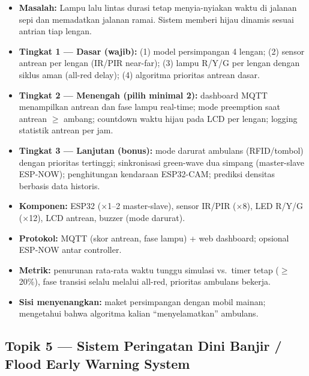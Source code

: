 \documentclass[11pt,a4paper]{article}
\begin{document}
\begin{itemize}
  \item \textbf{Masalah:} Lampu lalu lintas durasi tetap menyia-nyiakan waktu
        di jalanan sepi dan memadatkan jalanan ramai. Sistem memberi hijau
        dinamis sesuai antrian tiap lengan.
  \item \textbf{Tingkat 1 --- Dasar (wajib):} (1) model persimpangan 4
        lengan; (2) sensor antrean per lengan (IR/PIR near-far); (3) lampu
        R/Y/G per lengan dengan siklus aman (all-red delay); (4) algoritma
        prioritas antrean dasar.
  \item \textbf{Tingkat 2 --- Menengah (pilih minimal 2):} dashboard MQTT
        menampilkan antrean dan fase lampu real-time; mode preemption saat
        antrean $\geq$ ambang; countdown waktu hijau pada LCD per lengan;
        logging statistik antrean per jam.
  \item \textbf{Tingkat 3 --- Lanjutan (bonus):} mode darurat ambulans
        (RFID/tombol) dengan prioritas tertinggi; sinkronisasi green-wave dua
        simpang (master-slave ESP-NOW); penghitungan kendaraan ESP32-CAM;
        prediksi densitas berbasis data historis.
  \item \textbf{Komponen:} ESP32 ($\times$1--2 master-slave), sensor IR/PIR
        ($\times$8), LED R/Y/G ($\times$12), LCD antrean, buzzer (mode
        darurat).
  \item \textbf{Protokol:} MQTT (skor antrean, fase lampu) + web dashboard;
        opsional ESP-NOW antar controller.
  \item \textbf{Metrik:} penurunan rata-rata waktu tunggu simulasi vs.\ timer
        tetap ($\geq$ 20\%), fase transisi selalu melalui all-red, prioritas
        ambulans bekerja.
  \item \textbf{Sisi menyenangkan:} maket persimpangan dengan mobil mainan;
        mengetahui bahwa algoritma kalian ``menyelamatkan'' ambulans.
\end{itemize}

\subsection*{Topik 5 --- Sistem Peringatan Dini Banjir / Flood Early Warning System}
\end{document}
